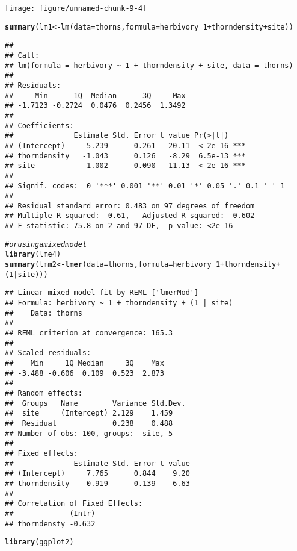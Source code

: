 \documentclass[12pt,a4paper]{scrartcl}\usepackage[]{graphicx}\usepackage[]{color}
\makeatletter
\def\maxwidth{ %
  \ifdim\Gin@nat@width>\linewidth
    \linewidth
  \else
    \Gin@nat@width
  \fi
}
\newcommand{\hlnum}[1]{\textcolor[rgb]{0.686,0.059,0.569}{#1}}%
\newcommand{\hlcom}[1]{\textcolor[rgb]{0.678,0.584,0.686}{\textit{#1}}}%
\newcommand{\hlopt}[1]{\textcolor[rgb]{0,0,0}{#1}}%
\newcommand{\hlstd}[1]{\textcolor[rgb]{0.345,0.345,0.345}{#1}}%
\newcommand{\hlkwb}[1]{\textcolor[rgb]{0.69,0.353,0.396}{#1}}%
\newcommand{\hlkwc}[1]{\textcolor[rgb]{0.333,0.667,0.333}{#1}}%
\newcommand{\hlkwd}[1]{\textcolor[rgb]{0.737,0.353,0.396}{\textbf{#1}}}%
\newenvironment{kframe}{%
 \def\at@end@of@kframe{}%
 \ifinner\ifhmode%
  \def\at@end@of@kframe{\end{minipage}}%
  \begin{minipage}{\columnwidth}%
 \fi\fi%
 \def\FrameCommand##1{\hskip\@totalleftmargin \hskip-\fboxsep
 \colorbox{shadecolor}{##1}\hskip-\fboxsep
     \hskip-\linewidth \hskip-\@totalleftmargin \hskip\columnwidth}%
 \MakeFramed {\advance\hsize-\width
   \@totalleftmargin\z@ \linewidth\hsize
   \@setminipage}}%
 {\par\unskip\endMakeFramed%
 \at@end@of@kframe}
\newenvironment{knitrout}{}{} %
\makeatother
\begin{document}
\begin{Answer}
\begin{knitrout}
\texttt{[image: figure/unnamed-chunk-9-4]} 
\begin{kframe}\begin{alltt}
\hlkwd{summary}\hlstd{(lm1} \hlkwb{<-} \hlkwd{lm}\hlstd{(}\hlkwc{data} \hlstd{= thorns ,} \hlkwc{formula} \hlstd{= herbivory} \hlopt{~} \hlnum{1}\hlopt{+}\hlstd{thorndensity}\hlopt{+} \hlstd{site ))}
\end{alltt}
\begin{verbatim}
## 
## Call:
## lm(formula = herbivory ~ 1 + thorndensity + site, data = thorns)
## 
## Residuals:
##     Min      1Q  Median      3Q     Max 
## -1.7123 -0.2724  0.0476  0.2456  1.3492 
## 
## Coefficients:
##              Estimate Std. Error t value Pr(>|t|)    
## (Intercept)     5.239      0.261   20.11  < 2e-16 ***
## thorndensity   -1.043      0.126   -8.29  6.5e-13 ***
## site            1.002      0.090   11.13  < 2e-16 ***
## ---
## Signif. codes:  0 '***' 0.001 '**' 0.01 '*' 0.05 '.' 0.1 ' ' 1
## 
## Residual standard error: 0.483 on 97 degrees of freedom
## Multiple R-squared:  0.61,	Adjusted R-squared:  0.602 
## F-statistic: 75.8 on 2 and 97 DF,  p-value: <2e-16
\end{verbatim}
\begin{alltt}
\hlcom{#or using a mixed model}
\hlkwd{library}\hlstd{(lme4)}
\hlkwd{summary}\hlstd{(lmm2} \hlkwb{<-} \hlkwd{lmer}\hlstd{(}\hlkwc{data} \hlstd{= thorns ,} \hlkwc{formula} \hlstd{= herbivory} \hlopt{~} \hlnum{1}\hlopt{+}\hlstd{thorndensity}\hlopt{+} \hlstd{(}\hlnum{1}\hlopt{|}\hlstd{site )))}
\end{alltt}
\begin{verbatim}
## Linear mixed model fit by REML ['lmerMod']
## Formula: herbivory ~ 1 + thorndensity + (1 | site)
##    Data: thorns
## 
## REML criterion at convergence: 165.3
## 
## Scaled residuals: 
##    Min     1Q Median     3Q    Max 
## -3.488 -0.606  0.109  0.523  2.873 
## 
## Random effects:
##  Groups   Name        Variance Std.Dev.
##  site     (Intercept) 2.129    1.459   
##  Residual             0.238    0.488   
## Number of obs: 100, groups:  site, 5
## 
## Fixed effects:
##              Estimate Std. Error t value
## (Intercept)     7.765      0.844    9.20
## thorndensity   -0.919      0.139   -6.63
## 
## Correlation of Fixed Effects:
##             (Intr)
## thorndensty -0.632
\end{verbatim}
\end{kframe}
\end{knitrout}

\begin{knitrout}
\color{fgcolor}\begin{kframe}
\begin{alltt}
\hlkwd{library}\hlstd{(ggplot2)}
\end{alltt}



\end{kframe}
\end{knitrout}
\end{Answer}
\end{document}
